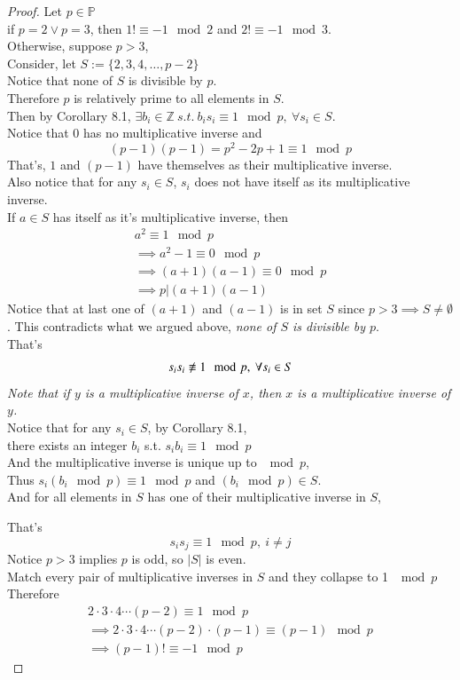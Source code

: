 \documentclass[11pt]{article}
\begin{document}
	\begin{proof}
		Let $p \in \mathbb{P}$ \\
		if $p = 2 \lor p = 3$, then $1! \equiv -1 \mod 2$ and $2! \equiv -1 \mod 3$. \\
		Otherwise, suppose $p > 3$, \\
		Consider, let $S := \{2, 3, 4, \dots, p-2\}$ \\
		Notice that none of $S$ is divisible by $p$. \\
		Therefore $p$ is relatively prime to all elements in $S$. \\
		Then by Corollary 8.1, $\exists b_i \in \mathbb{Z}\ s.t.\ b_i s_i \equiv 1 \mod p,\ \forall s_i \in S$. \\
		Notice that $0$ has no multiplicative inverse and 
		\[
			(p-1)(p-1)=p^2 - 2p + 1 \equiv 1 \mod p
		\]
		That's, $1$ and $(p-1)$ have themselves as their multiplicative inverse. \\
		Also notice that for any $s_i \in S$, $s_i$ does not have itself as its multiplicative inverse. \\
		If $a \in S$ has itself as it's multiplicative inverse, then
		\begin{gather*}
			a^2 \equiv 1 \mod p\\
			\implies a^2 - 1 \equiv 0 \mod p \\
			\implies (a+1)(a-1) \equiv 0 \mod p \\ 
			\implies p | (a+1)(a-1)
		\end{gather*}
		Notice that at last one of $(a+1)$ and $(a-1)$ is in set $S$ since $p > 3 \implies S \neq \emptyset$. This contradicts what we argued above, \emph{none of $S$ is divisible by $p$}.\\
		That's \[s_i s_i \centernot \equiv 1 \mod p,\ \forall s_i \in S\]
		\emph{Note that if $y$ is a multiplicative inverse of $x$, then $x$ is a multiplicative inverse of $y$.} \\
		Notice that for any $s_i \in S$, by Corollary 8.1, \\
		there exists an integer $b_i$ s.t. $s_i b_i \equiv 1 \mod p$\\
		And the multiplicative inverse is unique up to $\mod p$, \\
		Thus $s_i(b_i \mod p) \equiv 1 \mod p$ and $(b_i \mod p) \in S$.\\
		And for all elements in $S$ has one of their multiplicative inverse in $S$,
		
		That's
		\[
			s_i s_j \equiv 1 \mod p,\ i \neq j
		\]
		Notice $p > 3$ implies $p$ is odd, so $|S|$ is even. \\
		Match every pair of multiplicative inverses in $S$ and they collapse to 1 $\mod p$ \\
		Therefore 
		\begin{gather*}
			2\cdot 3 \cdot 4 \cdots (p-2) \equiv 1 \mod p \\
			\implies 2\cdot 3 \cdot 4 \cdots (p-2) \cdot (p-1) \equiv (p - 1) \mod p \\
			\implies (p-1)! \equiv -1 \mod p
		\end{gather*}
	\end{proof}
	
\end{document}
